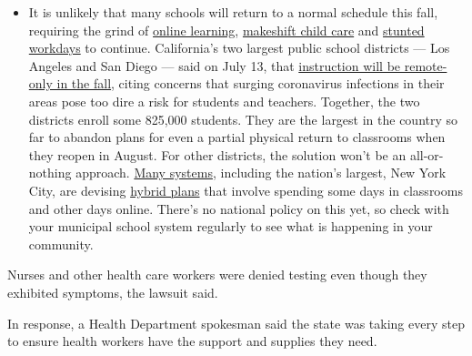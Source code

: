 \begin{itemize}
  \begin{itemize}
  \tightlist
  \item
    It is unlikely that many schools will return to a normal schedule
    this fall, requiring the grind of
    \href{https://www.nytimes.com/2020/06/05/us/coronavirus-education-lost-learning.html?action=click\&pgtype=Article\&state=default\&region=MAIN_CONTENT_3\&context=storylines_faq}{online
    learning},
    \href{https://www.nytimes.com/2020/05/29/us/coronavirus-child-care-centers.html?action=click\&pgtype=Article\&state=default\&region=MAIN_CONTENT_3\&context=storylines_faq}{makeshift
    child care} and
    \href{https://www.nytimes.com/2020/06/03/business/economy/coronavirus-working-women.html?action=click\&pgtype=Article\&state=default\&region=MAIN_CONTENT_3\&context=storylines_faq}{stunted
    workdays} to continue. California's two largest public school
    districts --- Los Angeles and San Diego --- said on July 13, that
    \href{https://www.nytimes.com/2020/07/13/us/lausd-san-diego-school-reopening.html?action=click\&pgtype=Article\&state=default\&region=MAIN_CONTENT_3\&context=storylines_faq}{instruction
    will be remote-only in the fall}, citing concerns that surging
    coronavirus infections in their areas pose too dire a risk for
    students and teachers. Together, the two districts enroll some
    825,000 students. They are the largest in the country so far to
    abandon plans for even a partial physical return to classrooms when
    they reopen in August. For other districts, the solution won't be an
    all-or-nothing approach.
    \href{https://bioethics.jhu.edu/research-and-outreach/projects/eschool-initiative/school-policy-tracker/}{Many
    systems}, including the nation's largest, New York City, are
    devising
    \href{https://www.nytimes.com/2020/06/26/us/coronavirus-schools-reopen-fall.html?action=click\&pgtype=Article\&state=default\&region=MAIN_CONTENT_3\&context=storylines_faq}{hybrid
    plans} that involve spending some days in classrooms and other days
    online. There's no national policy on this yet, so check with your
    municipal school system regularly to see what is happening in your
    community.
  \end{itemize}
\end{itemize}

Nurses and other health care workers were denied testing even though
they exhibited symptoms, the lawsuit said.

In response, a Health Department spokesman said the state was taking
every step to ensure health workers have the support and supplies they
need.

